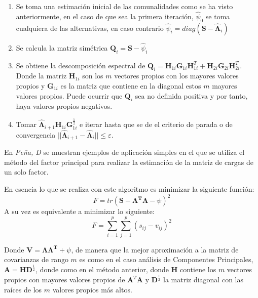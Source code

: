\begin{enumerate}
\item Se toma una estimación inicial de las comunalidades como se ha visto anteriormente, en el caso de que sea la primera iteración, $\hat{\psi}_0$ se toma cualquiera de las alternativas, en caso contrario $\hat{\psi}_i=diag(\textbf{S}-\hat{\mathbf{\Lambda}}_{i})$
\item Se calcula la matriz simétrica $\textbf{Q}_i=\textbf{S}-\hat{\psi}_i$
\item Se obtiene la descomposición espectral de $\textbf{Q}_i=\textbf{H}_{1i}\textbf{G}_{1i}\textbf{H}_{1i}^T+\textbf{H}_{2i}\textbf{G}_{2i}\textbf{H}_{2i}^T$. Donde la matriz $\textbf{H}_{1i}$ son los $m$ vectores propios con los mayores valores propios y $\textbf{G}_{1i}$ es la matriz que contiene en la diagonal estos $m$ mayores valores propios. Puede ocurrir que $\textbf{Q}_i$ sea no definida positiva y por tanto, haya valores propios negativos. 
\item Tomar $\hat{\mathbf{\Lambda}}_{i+1}\textbf{H}_{1i}\textbf{G}_{1i}^{\frac{1}{2}}$ e iterar hasta que se de el criterio de parada o de convergencia $||\hat{\mathbf{\Lambda}}_{i+1}-\hat{\mathbf{\Lambda}}_{i}||\leq \varepsilon$.
\end{enumerate}
\noindent En \emph{Peña, D}\cite{Peña 2002} se muestran ejemplos de aplicación simples en el que se utiliza el método del factor principal para realizar la estimación de la matriz de cargas de un solo factor.

\noindent En  esencia lo que se realiza con este algoritmo es minimizar la siguiente función:
\begin{equation}
F=tr(\textbf{S}-\mathbf{\mathbf{\Lambda}^T\mathbf{\Lambda}}-\psi)^2
\end{equation}
A su vez es equivalente a minimizar lo siguiente: 
\begin{equation}
F=\sum_{i=1}^p\sum_{j=1}^p(s_{ij}-v_{ij})^2
\end{equation}

\noindent Donde $\mathbf{V}=\mathbf{\mathbf{\Lambda}\mathbf{\Lambda}^T}+\psi$, de manera que la mejor aproximación a la matriz de covarianzas de rango $m$ es como en el caso análisis de Componentes Principales, $\textbf{A}=\textbf{H}\textbf{D}^{\frac{1}{2}}$, donde como en el método anterior, donde $\textbf{H}$ contiene los $m$ vectores  propios con mayores valores propios de $\textbf{A}^T\textbf{A}$ y $\textbf{D}^\frac{1}{2}$ la matriz diagonal con las raíces de los $m$ valores propios más altos. 

